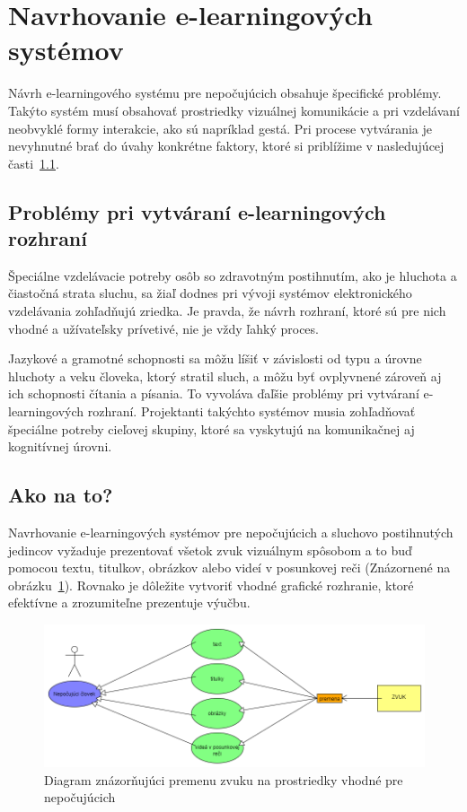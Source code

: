 \documentclass[10pt,oneside,slovak,a4paper]{article}
\begin{document}
\section{Navrhovanie e-learningových systémov} \label{navrhovanie}
Návrh e-learningového systému pre nepočujúcich obsahuje špecifické problémy. Takýto systém musí obsahovať prostriedky vizuálnej komunikácie a pri vzdelávaní neobvyklé formy interakcie, ako sú napríklad gestá. Pri procese vytvárania je nevyhnutné brať do úvahy konkrétne faktory, ktoré si priblížime v nasledujúcej časti~\ref{navrhovanie:problemy}.
\subsection{Problémy pri vytváraní e-learningových rozhraní} \label{navrhovanie:problemy}
Špeciálne vzdelávacie potreby osôb so zdravotným postihnutím, ako je hluchota a čiastočná strata sluchu, sa žiaľ dodnes pri vývoji systémov elektronického vzdelávania zohľadňujú zriedka. Je pravda, že návrh rozhraní, ktoré sú pre nich vhodné a užívateľsky prívetivé, nie je vždy ľahký proces.

Jazykové a gramotné schopnosti sa môžu líšiť v závislosti od typu a úrovne hluchoty a veku človeka, ktorý stratil sluch, a môžu byť ovplyvnené zároveň aj ich schopnosti čítania a písania. To vyvoláva ďaľšie problémy pri vytváraní e-learningových rozhraní. Projektanti takýchto systémov musia zohľadňovať špeciálne potreby cieľovej skupiny, ktoré sa vyskytujú na komunikačnej aj kognitívnej úrovni.\cite{pappas2018learning}

\subsection{Ako na to?}\label{navrhovanie:ako}
Navrhovanie e-learningových systémov pre nepočujúcich a sluchovo postihnutých jedincov vyžaduje prezentovať všetok zvuk vizuálnym spôsobom a to buď pomocou textu, titulkov, obrázkov alebo videí v posunkovej reči (Znázornené na obrázku~\ref{diagram}). Rovnako je dôležite vytvoriť vhodné grafické rozhranie, ktoré efektívne a zrozumiteľne prezentuje výučbu.
\begin{figure}[H]
   \includegraphics[scale=0.4]{diagram.png}
\centering
\caption{Diagram znázorňujúci premenu zvuku na prostriedky vhodné pre nepočujúcich}

\label{diagram}
\end{figure}
\end{document}
